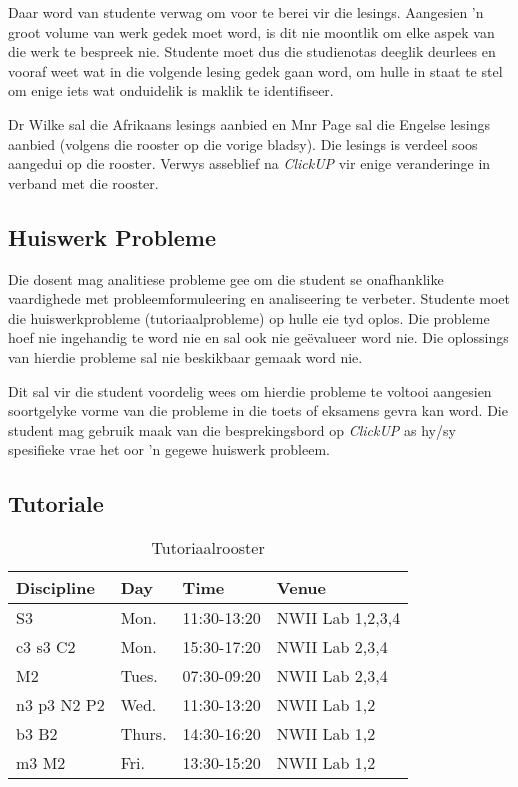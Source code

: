 	Daar word van studente verwag om voor te berei vir die lesings. Aangesien
	'n groot volume van werk gedek moet word, is dit nie moontlik om elke
	aspek van die werk te bespreek nie. Studente moet dus die studienotas 
	deeglik deurlees en vooraf weet wat in die volgende lesing gedek gaan word, om 
	hulle in staat te stel om enige iets wat onduidelik is maklik te identifiseer.
        
	Dr Wilke sal die Afrikaans lesings aanbied en Mnr Page sal die Engelse lesings
	aanbied (volgens die rooster op die vorige bladsy).  Die lesings is verdeel
	soos aangedui op die rooster.  Verwys asseblief na \textit{ClickUP} vir enige
	veranderinge in verband met die rooster.
        
    \subsection{Huiswerk Probleme}
	Die dosent mag analitiese probleme gee om die student se onafhanklike
	vaardighede met probleemformuleering en analiseering te verbeter.
	Studente moet die huiswerkprobleme (tutoriaalprobleme)
	op hulle eie tyd oplos.  Die probleme hoef nie ingehandig te word nie
	en sal ook nie ge\"{e}valueer word nie.  Die oplossings van hierdie 
	probleme sal nie beskikbaar gemaak word nie.
	
	Dit sal vir die student voordelig wees om hierdie probleme te voltooi
	aangesien soortgelyke vorme van die probleme in die toets of eksamens
	gevra kan word.  Die student mag gebruik maak van die besprekingsbord op \textit{ClickUP}
	as hy/sy spesifieke vrae het oor 'n gegewe huiswerk probleem.
    
     \subsection{Tutoriale}
        \begin{table}[!h]
            \begin{center}
            \begin{tabular}{|l|l|l|l|}
                \hline
                {\bf Discipline} & {\bf Day} & {\bf Time} & {\bf Venue} \\
                \hline
                S3          & Mon.   & 11:30-13:20 & NWII Lab 1,2,3,4 \\
                c3 s3 C2    & Mon.   & 15:30-17:20 & NWII Lab 2,3,4 \\
                M2          & Tues.  & 07:30-09:20 & NWII Lab 2,3,4 \\
                n3 p3 N2 P2 & Wed.   & 11:30-13:20 & NWII Lab 1,2 \\
                b3 B2       & Thurs. & 14:30-16:20 & NWII Lab 1,2 \\
                m3 M2       & Fri.   & 13:30-15:20 & NWII Lab 1,2 \\
                \hline
            \end{tabular}
            \caption{Tutoriaalrooster}
            \label{tab:tutorials}
            \end{center}
        \end{table}
        
